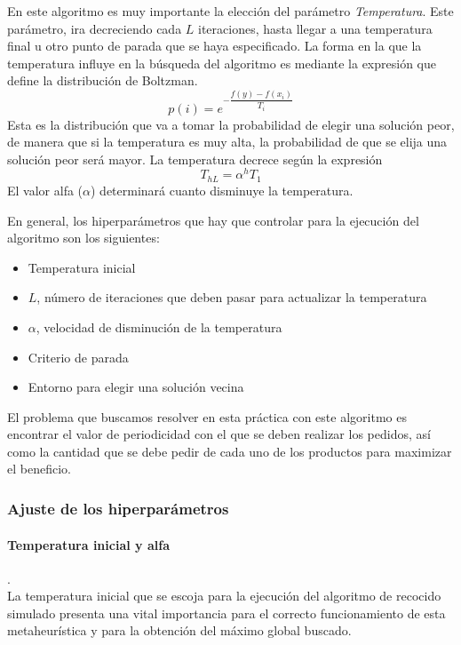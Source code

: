 \documentclass[a4paper,12pt]{article}
\begin{document}
	En este algoritmo es muy importante la elección del parámetro \textit{Temperatura}. Este parámetro, ira decreciendo cada $L$ iteraciones, hasta llegar a una temperatura final u otro punto de parada que se haya especificado. La forma en la que la temperatura influye en la búsqueda del algoritmo es mediante la expresión que define la distribución de Boltzman. 
	$$p(i)=e^{-\dfrac{f(y)-f(x_i)}{T_i}}$$
	Esta es la distribución que va a tomar la probabilidad de elegir una solución peor, de manera que si la temperatura es muy alta, la probabilidad de que se elija una solución peor será mayor. La temperatura decrece según la expresión
	$$T_{hL}=\alpha ^h T_1$$
	El valor alfa ($\alpha$) determinará cuanto disminuye la temperatura.
	
	En general, los hiperparámetros que hay que controlar para la ejecución del algoritmo son los siguientes:
	\begin{itemize}
		\item Temperatura inicial
		\item $L$, número de iteraciones que deben pasar para actualizar la temperatura
		\item $\alpha$, velocidad de disminución de la temperatura
		\item Criterio de parada
		\item Entorno para elegir una solución vecina
	\end{itemize}
	
	El problema que buscamos resolver en esta práctica con este algoritmo es encontrar el valor de periodicidad con el que se deben realizar los pedidos, así como la cantidad que se debe pedir de cada uno de los productos para maximizar el beneficio.
	
	\subsubsection{Ajuste de los hiperparámetros}
	
	\paragraph{Temperatura inicial y alfa}.\\
	La temperatura inicial que se escoja para la ejecución del algoritmo de recocido simulado presenta una vital importancia para el correcto funcionamiento de esta metaheurística y para la obtención del máximo global buscado.\\
\end{document}
